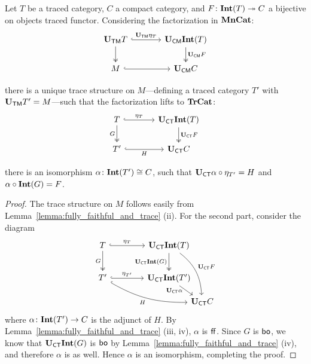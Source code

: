 \documentclass[12pt,oneside,article,draft]{memoir}
\begin{document}
\begin{lemma}\label{lem:Tr_bo_Int}
   Let $T$ be a traced category, $C$ a compact category, and $F\colon\mathbf{Int}(T)\twoheadrightarrow C$ a
   bijective on objects traced functor. Considering the factorization in $\mathbf{MnCat}$:
   \begin{equation*}
      \begin{tikzcd}[column sep=large]
         \UTM T \ar[r,hook,"\UTM\eta_{T}"] \ar[d,two heads]
            & \UCM\Int(T) \ar[d,two heads,"\UCM F"] \\
         M \ar[r,hook] & \UCM C
      \end{tikzcd}
   \end{equation*}
   \begin{compactitem}
      \item there is a unique trace structure on $M$---defining a traced category $T'$ with $\mathbf{U}_{\mathsf{TM}}
         T'=M$---such that the factorization lifts to $\mathbf{TrCat}$:
         \begin{equation*}
            \begin{tikzcd}[column sep=large]
               T \ar[r,hook,"\eta_{T}"] \ar[d,two heads,"G"']
                  & \UCT\Int(T) \ar[d,two heads,"\UCT F"] \\
               T' \ar[r,hook,"H"'] & \UCT C
            \end{tikzcd}
         \end{equation*}
      \item there is an isomorphism $\alpha\colon\mathbf{Int}(T')\cong C$, such that $\mathbf{U}_{\mathsf{CT}}\alpha\circ
         \eta_{T'}=H$ and $\alpha\circ\mathbf{Int}(G)=F$.
   \end{compactitem}
\end{lemma}
\begin{proof}
   The trace structure on $M$ follows easily from Lemma~\ref{lemma:fully_faithful_and_trace} (ii).
   For the second part, consider the diagram
   \begin{equation*}
      \begin{tikzcd}[column sep=4em, row sep=5ex]
         T \ar[r,hook,"\eta_{T}"] \ar[d,two heads,"G"']
            & \UCT\Int(T) \ar[d,two heads,"\UCT\Int(G)"']
               \ar[ddr,bend left=25,"\UCT F"] &[between origins] \\
         T' \ar[r,hook,"\eta_{T'}"] \ar[drr,hook,bend right=15,"H"']
            & \UCT\Int(T') \ar[dr,"\UCT\alpha"' {inner sep=0pt,pos=.25}] & \\[-10]
         &&\UCT C
      \end{tikzcd}
   \end{equation*}
   where $\alpha\colon\mathbf{Int}(T')\to C$ is the adjunct of $H$. By
   Lemma~\ref{lemma:fully_faithful_and_trace} (iii, iv), $\alpha$ is $\mathsf{ff}$. Since $G$ is $\mathsf{bo}$, we
   know that $\mathbf{U}_{\mathsf{CT}}\mathbf{Int}(G)$ is $\mathsf{bo}$ by Lemma~\ref{lemma:fully_faithful_and_trace} (iv), and
   therefore $\alpha$ is as well. Hence $\alpha$ is an isomorphism, completing the proof.
\end{proof}
\end{document}
